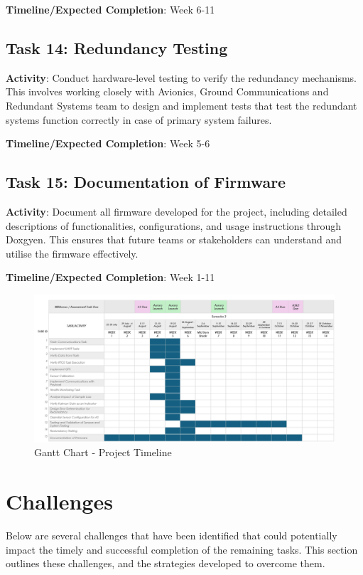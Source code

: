 \textbf{Timeline/Expected Completion}: Week 6-11

\subsection{Task 14: Redundancy Testing}
\textbf{Activity}: Conduct hardware-level testing to verify the redundancy mechanisms. This involves working closely with Avionics, Ground Communications and Redundant Systems team to design and implement tests that test the redundant systems function correctly in case of primary system failures. 

\textbf{Timeline/Expected Completion}: Week 5-6

\subsection{Task 15: Documentation of Firmware}
\textbf{Activity}: Document all firmware developed for the project, including detailed descriptions of functionalities, configurations, and usage instructions through Doxgyen. This ensures that future teams or stakeholders can understand and utilise the firmware effectively. 

\textbf{Timeline/Expected Completion}: Week 1-11

\clearpage 
\begin{landscape}
\thispagestyle{empty} 
\begin{figure}[!htbp] 
    \centering
    \includegraphics[width=\paperheight, height=\paperwidth, keepaspectratio]{img/Gantt-Chart-CP.png} 
    \caption{Gantt Chart - Project Timeline}
    \label{fig:gantt-chart}
\end{figure}
\end{landscape}

\clearpage 



\section{Challenges}
Below are several challenges that have been identified that could potentially impact the timely and successful completion of the remaining tasks. This section outlines these challenges, and the strategies developed to overcome them.

